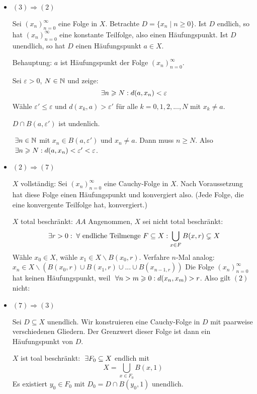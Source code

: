 \documentclass[main.tex]{subfiles}
\begin{document}
\begin{Beweis}[Teil $I$]
  \begin{itemize}
    \item $(3) \Rightarrow (2)$

      Sei $(x_n)_{n=0}^\infty$ eine Folge in $X$. Betrachte $D = \{x_n \mid n \geq 0\}$. Ist $D$ endlich, so hat $(x_n)_{n=0}^\infty$ eine konstante Teilfolge, also einen Häufungspunkt. Ist $D$ unendlich, so hat $D$ einen Häufungspunkt $a \in X$.

      Behauptung: $a$ ist Häufungspunkt der Folge $(x_n)_{n=0}^\infty$.

      Sei $\varepsilon > 0$, $N \in \mathbb{N}$ und zeige:
      $$\;\exists n \geqslant N : d(a,x_n) < \varepsilon$$
      Wähle $\varepsilon' \leq \varepsilon$ und $d(x_k,a)>\varepsilon'$ für alle $k = 0,1,2,...,N$ mit $x_k \neq a$.

      \begin{center}
        $D \cap B(a, \varepsilon')$ ist undenlich.
      \end{center}

      $\;\exists n \in \mathbb{N}$ mit $x_n \in B(a,\varepsilon')$ und $x_n \neq a$. Dann muss $n \geq N$. Also $\;\exists n \geqslant N : d(a, x_n) < \varepsilon' < \varepsilon$.
    \item $(2) \Rightarrow (7)$

      $X$ vollständig: Sei $(x_n)_{n=0}^\infty$ eine Cauchy-Folge in $X$. Nach Voraussetzung hat diese Folge einen Häufungspunkt und konvergiert also. (Jede Folge, die eine konvergente Teilfolge hat, konvergiert.)

      $X$ total beschränkt: $A\!\!\!A$ Angenommen, $X$ sei nicht total beschränkt:
      $$\;\exists r > 0 : \;\forall \text{ endliche Teilmenge } F \subseteq X : \bigcup_{x \in F} B(x, r) \subsetneq X$$
      Wähle $x_0 \in X$, wähle $x_1 \in X \backslash B(x_0, r)$. Verfahre $n$-Mal analog: $x_n \in X \backslash (B(x_0,r) \cup B(x_1,r) \cup ... \cup B(x_{n-1, r}))$ Die Folge $(x_n)_{n=0}^\infty$ hat keinen Häufungspunkt, weil $\;\forall n > m \geqslant 0 : d(x_n, x_m) > r$. Also gilt $(2)$ nicht: \lightning
    \item $(7) \Rightarrow (3)$

      Sei $D \subseteq X$ unendlich. Wir konstruieren eine Cauchy-Folge in $D$ mit paarweise verschiedenen Gliedern. Der Grenzwert dieser Folge ist dann ein Häufungspunkt von $D$.

      $X$ ist toal beschränkt: $\;\exists F_0 \subseteq X$ endlich mit
      $$X = \bigcup_{x \in F_0} B(x, 1)$$
      Es existiert $y_0 \in F_0$ mit $D_0 = D \cap B(y_0, 1)$ unendlich.


\end{itemize}
\end{Beweis}
\end{document}
